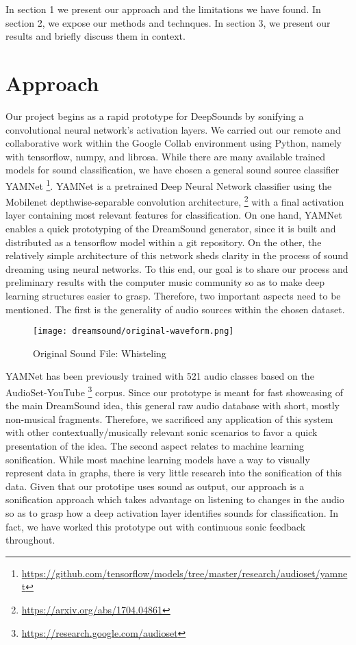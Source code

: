 \documentclass{nime-alternate}
\begin{document}
In section 1 we present our approach and the limitations we have found. In section 2, we expose our methods and technques. In section 3, we present our results and briefly discuss them in context.

\section{Approach}
Our project begins as a rapid prototype for DeepSounds by sonifying a convolutional neural network's activation layers. We carried out our remote and collaborative work within the Google Collab environment using Python, namely with tensorflow, numpy, and librosa. While there are many available trained models for sound classification, we have chosen a general sound source classifier YAMNet \footnote{\url{https://github.com/tensorflow/models/tree/master/research/audioset/yamnet}}. YAMNet is a pretrained Deep Neural Network classifier using the Mobilenet depthwise-separable convolution architecture, \footnote{\url{https://arxiv.org/abs/1704.04861}} with a final activation layer containing most relevant features for classification. On one hand, YAMNet enables a quick prototyping of the DreamSound generator, since it is built and distributed as a tensorflow model within a git repository. On the other, the relatively simple architecture of this network sheds clarity in the process of sound dreaming using neural networks. To this end, our goal is to share our process and preliminary results with the computer music community so as to make deep learning structures easier to grasp. Therefore, two important aspects need to be mentioned. The first is the generality of audio sources within the chosen dataset. 
\begin{figure*}[htbp]
       \centering
              \texttt{[image: dreamsound/original-waveform.png]}
       \caption{Original Sound File: Whisteling}
       \label{fig:img-0}
\end{figure*}
YAMNet has been previously trained with 521 audio classes based on the AudioSet-YouTube \footnote{\url{https://research.google.com/audioset}} corpus. Since our prototype is meant for fast showcasing of the main DreamSound idea, this general raw audio database with short, mostly non-musical fragments. Therefore, we sacrificed any application of this system with other contextually/musically relevant sonic scenarios to favor a quick presentation of the idea. The second aspect relates to machine learning sonification. While most machine learning models have a way to visually represent data in graphs, there is very little research into the sonification of this data. Given that our prototipe uses sound as output, our approach is a sonification approach which takes advantage on listening to changes in the audio so as to grasp how a deep activation layer identifies sounds for classification. In fact, we have worked this prototype out with continuous sonic feedback throughout.
\end{document}
